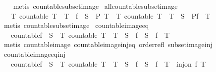 \begin{isabellebody}
%
\isadelimproof
\ \ %
\endisadelimproof
%
\isatagproof
{}\isamarkupfalse%
\ {\isacharparenleft}metis\ countable{\isacharunderscore}subset{\isacharunderscore}image{\isacharparenright}%
\endisatagproof
{\isafoldproof}%
%
\isadelimproof
\isanewline
%
\endisadelimproof
\isanewline
{}\isamarkupfalse%
\ all{\isacharunderscore}countable{\isacharunderscore}subset{\isacharunderscore}image{\isacharcolon}\isanewline
\ \ \ {\isachardoublequoteopen}{\isacharparenleft}{\isasymforall}T{\isachardot}\ countable\ T\ {\isasymand}\ T\ {\isasymsubseteq}\ f\ {\isacharbackquote}\ S\ {\isasymlongrightarrow}\ P\ T{\isacharparenright}\ {\isasymlongleftrightarrow}\ {\isacharparenleft}{\isasymforall}T{\isachardot}\ countable\ T\ {\isasymand}\ T\ {\isasymsubseteq}\ S\ {\isasymlongrightarrow}\ P{\isacharparenleft}f\ {\isacharbackquote}\ T{\isacharparenright}{\isacharparenright}{\isachardoublequoteclose}\isanewline
%
\isadelimproof
\ \ %
\endisadelimproof
%
\isatagproof
{}\isamarkupfalse%
\ {\isacharparenleft}metis\ countable{\isacharunderscore}subset{\isacharunderscore}image{\isacharparenright}%
\endisatagproof
{\isafoldproof}%
%
\isadelimproof
\isanewline
%
\endisadelimproof
\isanewline
{}\isamarkupfalse%
\ countable{\isacharunderscore}image{\isacharunderscore}eq{\isacharcolon}\isanewline
\ \ \ {\isachardoublequoteopen}countable{\isacharparenleft}f\ {\isacharbackquote}\ S{\isacharparenright}\ {\isasymlongleftrightarrow}\ {\isacharparenleft}{\isasymexists}T{\isachardot}\ countable\ T\ {\isasymand}\ T\ {\isasymsubseteq}\ S\ {\isasymand}\ f\ {\isacharbackquote}\ S\ {\isacharequal}\ f\ {\isacharbackquote}\ T{\isacharparenright}{\isachardoublequoteclose}\isanewline
%
\isadelimproof
\ \ %
\endisadelimproof
%
\isatagproof
{}\isamarkupfalse%
\ {\isacharparenleft}metis\ countable{\isacharunderscore}image\ countable{\isacharunderscore}image{\isacharunderscore}inj{\isacharunderscore}eq\ order{\isacharunderscore}refl\ subset{\isacharunderscore}image{\isacharunderscore}inj{\isacharparenright}%
\endisatagproof
{\isafoldproof}%
%
\isadelimproof
\isanewline
%
\endisadelimproof
\isanewline
{}\isamarkupfalse%
\ countable{\isacharunderscore}image{\isacharunderscore}eq{\isacharunderscore}inj{\isacharcolon}\isanewline
\ \ \ {\isachardoublequoteopen}countable{\isacharparenleft}f\ {\isacharbackquote}\ S{\isacharparenright}\ {\isasymlongleftrightarrow}\ {\isacharparenleft}{\isasymexists}T{\isachardot}\ countable\ T\ {\isasymand}\ T\ {\isasymsubseteq}\ S\ {\isasymand}\ f\ {\isacharbackquote}\ S\ {\isacharequal}\ f\ {\isacharbackquote}\ T\ {\isasymand}\ inj{\isacharunderscore}on\ f\ T{\isacharparenright}{\isachardoublequoteclose}\isanewline

\end{isabellebody}
